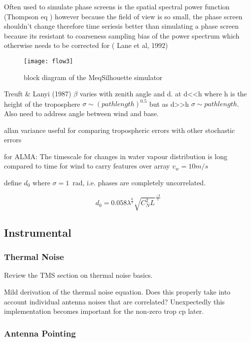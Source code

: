 Often used to simulate phase screens is the spatial spectral power function (Thompson eq ) however because the field of view is so small, the phase screen shouldn't change therefore time seriesis better than simulating a phase screen because its resistant to coarseness sampling bias of the power spectrum which otherwise needs to be corrected for ( Lane et al, 1992)
\begin{figure}[h!]
\centering
    \texttt{[image: flow3]}
    \caption{block diagram of the MeqSilhouette simulator }
\end{figure}

Treuft \& Lanyi (1987) $\beta$ varies with zenith angle and d.  at d<<h where h is the height of the troposphere $\sigma \sim (pathlength)^0.5$ but as d>>h $\sigma \sim pathlength$. Also need to address angle between wind and base.
 
allan variance useful for comparing tropospheric errors with other stochastic errors

for ALMA:
The timescale for changes in water vapour distribution is long compared to time for wind to carry features over array $v_w=10 m/s$

define $d_0$ where $\sigma = 1$~rad, i.e. phases are completely uncorrelated.

\begin{equation}
d_0 = 0.058 \lambda^\frac{6}{5}\sqrt{C_N^2 L}^\frac{-3}{5}
\end{equation}

\subsection{Instrumental}

\subsubsection{Thermal Noise}
Review the TMS section on thermal noise basics.

Mild derivation of the thermal noise equation.
Does this properly take into account individual antenna noises that are correlated? Unexpectedly this implementation becomes important for the non-zero trop cp later.

\subsubsection{Antenna Pointing}

